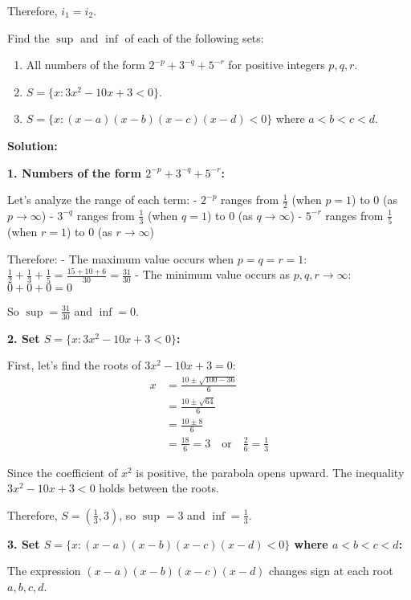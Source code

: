 Therefore, $i_1 = i_2$.

\begin{problembox}
Find the $\sup$ and $\inf$ of each of the following sets:
\begin{enumerate}[label=(\alph*)]
\item All numbers of the form $2^{-p} + 3^{-q} + 5^{-r}$ for positive integers $p, q, r$.
\item $S = \{x : 3x^2 - 10x + 3 < 0\}$.
\item $S = \{x : (x - a)(x - b)(x - c)(x - d) < 0\}$ where $a < b < c < d$.
\end{enumerate}
\end{problembox}

\textbf{Solution:}

\textbf{1. Numbers of the form $2^{-p} + 3^{-q} + 5^{-r}$:}

Let's analyze the range of each term:
- $2^{-p}$ ranges from $\frac{1}{2}$ (when $p = 1$) to $0$ (as $p \to \infty$)
- $3^{-q}$ ranges from $\frac{1}{3}$ (when $q = 1$) to $0$ (as $q \to \infty$)
- $5^{-r}$ ranges from $\frac{1}{5}$ (when $r = 1$) to $0$ (as $r \to \infty$)

Therefore:
- The maximum value occurs when $p = q = r = 1$: $\frac{1}{2} + \frac{1}{3} + \frac{1}{5} = \frac{15 + 10 + 6}{30} = \frac{31}{30}$
- The minimum value occurs as $p, q, r \to \infty$: $0 + 0 + 0 = 0$

So $\sup = \frac{31}{30}$ and $\inf = 0$.

\textbf{2. Set $S = \{x : 3x^2 - 10x + 3 < 0\}$:}

First, let's find the roots of $3x^2 - 10x + 3 = 0$:
\begin{align*}
x &= \frac{10 \pm \sqrt{100 - 36}}{6} \\
&= \frac{10 \pm \sqrt{64}}{6} \\
&= \frac{10 \pm 8}{6} \\
&= \frac{18}{6} = 3 \quad \text{or} \quad \frac{2}{6} = \frac{1}{3}
\end{align*}

Since the coefficient of $x^2$ is positive, the parabola opens upward. The inequality $3x^2 - 10x + 3 < 0$ holds between the roots.

Therefore, $S = (\frac{1}{3}, 3)$, so $\sup = 3$ and $\inf = \frac{1}{3}$.

\textbf{3. Set $S = \{x : (x - a)(x - b)(x - c)(x - d) < 0\}$ where $a < b < c < d$:}

The expression $(x - a)(x - b)(x - c)(x - d)$ changes sign at each root $a, b, c, d$.

